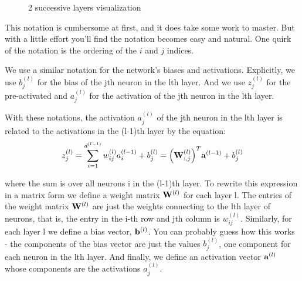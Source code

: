 \documentclass[14pt, a4paper]{article}
\numberwithin{equation}{section}
\numberwithin{algorithm}{section}
\numberwithin{figure}{section}
\begin{document}
\begin{figure}[h!]
{
  }
  \caption{2 successive layers visualization}
\end{figure}

This notation is cumbersome at first, and it does take some work to master. 
But with a little effort you'll find the notation becomes easy and natural. 
One quirk of the notation is the ordering of the $i$ and $j$ indices. 

We use a similar notation for the network's biases and activations. 
Explicitly, we use $b_j^{(l)}$ for the bias of the jth neuron in the lth layer. 
And we use $z_j^{(l)}$ for the pre-activated and $a_j^{(l)}$ for the activation of the jth neuron in the lth layer.

With these notations, the activation $a_j^{(l)}$ of the jth neuron in the lth layer is related to the activations in the (l-1)th layer by the equation:
\begin{equation}
	  z_j^{(l)}=\sum_{i=1}^{d^{(l-1)}}w_{ij}^{(l)}a_i^{(l-1)}+b_j^{(l)}=\Big(\bold{W}_{:,j}^{(l)}\Big)^T \bold{a}^{(l-1)} + b_j^{(l)}
\end{equation}

where the sum is over all neurons i in the (l-1)th layer.
To rewrite this expression in a matrix form we define a weight matrix $\bold{W}^{(l)}$ for each layer l. 
The entries of the weight matrix $\bold{W}^{(l)}$ are just the weights connecting to the lth layer of neurons, that is, the entry in the i-th row and jth column is $w_{ij}^{(l)}$. 
Similarly, for each layer l we define a bias vector, $\bold{b}^{(l)}$. 
You can probably guess how this works - the components of the bias vector are just the values $b_j^{(l)}$, one component for each neuron in the lth layer. 
And finally, we define an activation vector $\bold{a}^{(l)}$ whose components are the activations $a_j^{(l)}$.
\end{document}
